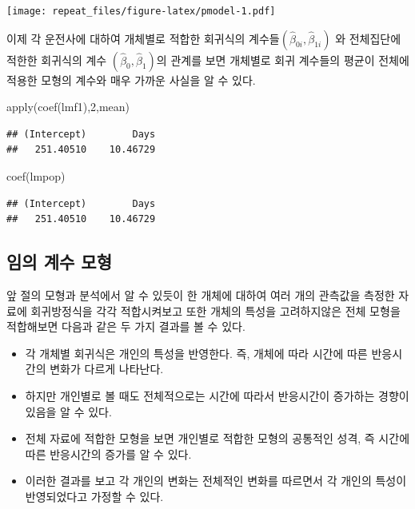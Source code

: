 \documentclass[
]{book}
\newenvironment{Shaded}{\begin{snugshade}}{\end{snugshade}}
\newcommand{\DecValTok}[1]{\textcolor[rgb]{0.00,0.00,0.81}{#1}}
\newcommand{\FunctionTok}[1]{\textcolor[rgb]{0.00,0.00,0.00}{#1}}
\newcommand{\NormalTok}[1]{#1}
\providecommand{\tightlist}{%
  \setlength{\itemsep}{0pt}\setlength{\parskip}{0pt}}
\theoremstyle{definition}
\theoremstyle{definition}
\theoremstyle{definition}
\theoremstyle{remark}
\begin{document}
\texttt{[image: repeat\_files/figure-latex/pmodel-1.pdf]}

이제 각 운전사에 대하여 개체별로 적합한 회귀식의 계수들\((\hat \beta_{0i}, \hat \beta_{1i})\) 와 전체집단에 적한한 회귀식의 계수 \((\hat \beta_{0}, \hat \beta_{1})\)의 관계를 보면 개체별로 회귀 계수들의 평균이 전체에 적용한 모형의 계수와 매우 가까운 사실을 알 수 있다.

\begin{Shaded}
\begin{Highlighting}[]
\FunctionTok{apply}\NormalTok{(}\FunctionTok{coef}\NormalTok{(lmf1),}\DecValTok{2}\NormalTok{,mean)}
\end{Highlighting}
\end{Shaded}

\begin{verbatim}
## (Intercept)        Days 
##   251.40510    10.46729
\end{verbatim}

\begin{Shaded}
\begin{Highlighting}[]
\FunctionTok{coef}\NormalTok{(lmpop)}
\end{Highlighting}
\end{Shaded}

\begin{verbatim}
## (Intercept)        Days 
##   251.40510    10.46729
\end{verbatim}

\hypertarget{uxc784uxc758-uxacc4uxc218-uxbaa8uxd615}{%
\subsection{임의 계수 모형}\label{uxc784uxc758-uxacc4uxc218-uxbaa8uxd615}}

앞 절의 모형과 분석에서 알 수 있듯이 한 개체에 대하여 여러 개의 관측값을 측정한 자료에 회귀방정식을 각각 적합시켜보고 또한 개체의 특성을 고려하지않은 전체 모형을 적합해보면 다음과 같은 두 가지 결과를 볼 수 있다.

\begin{itemize}
\tightlist
\item
  각 개체별 회귀식은 개인의 특성을 반영한다. 즉, 개체에 따라 시간에 따른 반응시간의 변화가 다르게 나타난다.
\item
  하지만 개인별로 볼 때도 전체적으로는 시간에 따라서 반응시간이 증가하는 경향이 있음을 알 수 있다.
\item
  전체 자료에 적합한 모형을 보면 개인별로 적합한 모형의 공통적인 성격, 즉 시간에 따른 반응시간의 증가를 알 수 있다.
\item
  이러한 결과를 보고 각 개인의 변화는 전체적인 변화를 따르면서 각 개인의 특성이 반영되었다고 가정할 수 있다.
\end{itemize}
\end{document}
